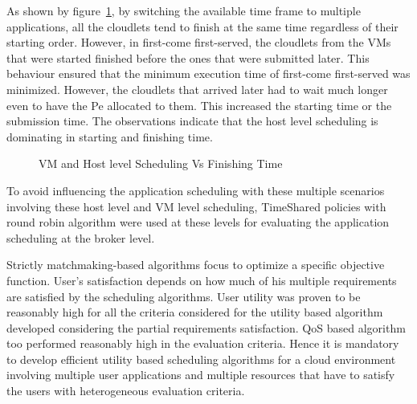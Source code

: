 \documentclass[times, 10pt,twocolumn]{article}
\begin{document}
As shown by figure~\ref{fig:finish}, by switching the available time frame to multiple applications, all the cloudlets tend to finish at the same time regardless of their starting order. However, in first-come first-served, the cloudlets from the VMs that were started finished before the ones that were submitted later. This behaviour ensured that the minimum execution time of first-come first-served was minimized. However, the cloudlets that arrived later had to wait much longer even to have the Pe allocated to them. This increased the starting time or the submission time. The observations indicate that the host level scheduling is dominating in starting and finishing time.
\begin{figure}[ht]
 \caption{VM and Host level Scheduling Vs Finishing Time}
 \label{fig:finish}
\end{figure}

To avoid influencing the application scheduling with these multiple scenarios involving these host level and VM level scheduling, TimeShared policies with round robin algorithm were used at these levels for evaluating the application scheduling at the broker level.

Strictly matchmaking-based algorithms focus to optimize a specific objective function. User's satisfaction depends on how much of his multiple requirements are satisfied by the scheduling algorithms. User utility was proven to be reasonably high for all the criteria considered for the utility based algorithm developed considering the partial requirements satisfaction. QoS based algorithm too performed reasonably high in the evaluation criteria. Hence it is mandatory to develop efficient utility based scheduling algorithms for a cloud environment involving multiple user applications and multiple resources that have to satisfy the users with heterogeneous evaluation criteria.
\end{document}

